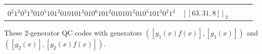 \documentclass[journal]{IEEEtran}
\begin{document}
\begin{table}[!t]
\begin{threeparttable}
\begin{tabular}{ccccc}
{	$1010^{2}1^{2}0^{2}1^{2}010^{2}1^{3}0^{2}10^{2}1010^{3}1^{2}0101^{2}01010^{4}1^{3}0^{4}1^{2}0^{2}1$,\\ $0^{2}1^{2}0^{2}1^{3}010^{5}101^{2}010101^{2}010^{6}101^{2}010101^{2}010^{5}101^{3}0^{2}1^2$} & $[[63,31,8]]_2$ \\ \hline
	\end{tabular}
\begin{tablenotes}    %
	\footnotesize               %
	\item[3] These $2$-generator QC codes with generators $([g_1(x)f(x)],[g_1(x)])$ and $([g_2(x)],[g_2(x)f(x)])$.        %
\end{tablenotes}            %
\end{threeparttable}       %
\end{table}

 






 
 
\end{document}

